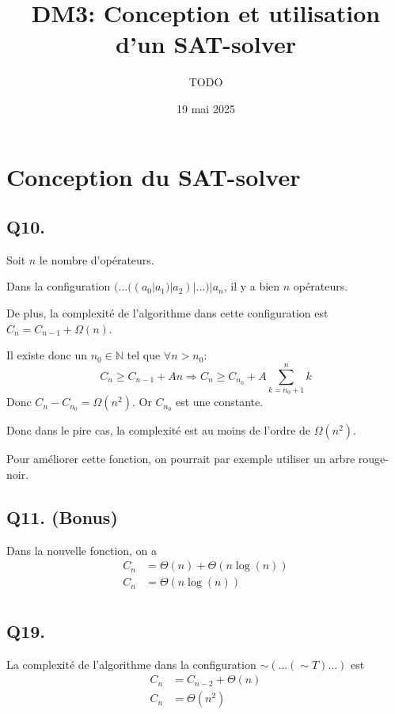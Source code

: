 

\title{DM3: Conception et utilisation d’un SAT-solver}
\author{TODO}
\date{19 mai 2025}



\maketitle
\section{Conception du SAT-solver}
\subsection*{Q10.}
Soit $n$ le nombre d'opérateurs.

Dans la configuration $(...((a_0 | a_1) | a_2) | ...) | a_n$,
il y a bien $n$ opérateurs.

De plus, la complexité de l'algorithme dans cette configuration est $C_n = C_{n-1} + \Omega(n)$.

Il existe donc un $n_0 \in \mathbb{N}$ tel que $\forall n > n_0$:
\begin{equation*}
    C_n \ge C_{n-1} + An
    \Longrightarrow C_n \ge C_{n_0} + A\sum_{k=n_0+1}^n{k}
\end{equation*}
Donc $C_n - C_{n_0} = \Omega(n^2)$.
Or $C_{n_0}$ est une constante.

Donc dans le pire cas, la complexité est au moins de l’ordre de $\Omega(n^2)$.

Pour améliorer cette fonction, on pourrait par exemple utiliser un arbre rouge-noir.

\subsection*{Q11. (Bonus)}
Dans la nouvelle fonction, on a
\begin{align*}
    C_n &= \Theta(n) + \Theta(n\log(n))\\
    C_n &= \boxed{\Theta(n\log(n))}\\
\end{align*}

\subsection*{Q19.}
La complexité de l’algorithme dans la configuration $\sim(...(\sim T)...)$ est
\begin{align*}
    C_n &= C_{n-2} + \Theta(n)\\
    C_n &= \boxed{\Theta(n^2)}\\
\end{align*}

